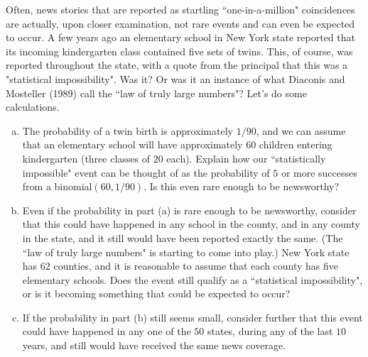 \documentclass[14pt]{elegantbook}
\begin{document}
    \setcounter{exer}{8}
    \begin{exercise}
        Often, news stories that are reported as startling ``one-in-a-million" coincidences are actually, upon closer examination, not rare events and can even be expected to occur. A few years ago an elementary school in New York state reported that its incoming kindergarten class contained five sets of twins. This, of course, was reported throughout the state, with a quote from the principal that this was a "statistical impossibility". Was it? Or was it an instance of what Diaconis and Mosteller (1989) call the ``law of truly large numbers"? Let's do some calculations. 
        \begin{enumerate}[(a)]
            \item The probability of a twin birth is approximately $1/90$, and we can assume that an elementary school will have approximately $60$ children entering kindergarten (three classes of $20$ each). Explain how our ``statistically impossible" event can be thought of as the probability of $5$ or more successes from a binomial$(60, 1/90)$. Is this even rare enough to be newsworthy? 
            \item Even if the probability in part (a) is rare enough to be newsworthy, consider that this could have happened in any school in the county, and in any county in the state, and it still would have been reported exactly the same. (The ``law of truly large numbers" is starting to come into play.) New York state has $62$ counties, and it is reasonable to assume that each county has five elementary schools. Does the event still qualify as a ``statistical impossibility", or is it becoming something that could be expected to occur? 
            \item If the probability in part (b) still seems small, consider further that this event could have happened in any one of the $50$ states, during any of the last $10$ years, and still would have received the same news coverage. 
        \end{enumerate}
    \end{exercise}
\end{document}
